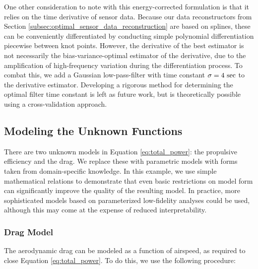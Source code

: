 One other consideration to note with this energy-corrected formulation is that it relies on the time derivative of sensor data. Because our data reconstructors from Section \ref{subsec:optimal_sensor_data_reconstruction} are based on splines, these can be conveniently differentiated by conducting simple polynomial differentiation piecewise between knot points. However, the derivative of the best estimator is not necessarily the bias-variance-optimal estimator of the derivative, due to the amplification of high-frequency variation during the differentiation process. To combat this, we add a Gaussian low-pass-filter with time constant $\sigma=4\ \rm sec$ to the derivative estimator. Developing a rigorous method for determining the optimal filter time constant is left as future work, but is theoretically possible using a cross-validation approach.

\subsection{Modeling the Unknown Functions}
\label{subsec:modeling_unknown_functions}

There are two unknown models in Equation \ref{eq:total_power}: the propulsive efficiency and the drag. We replace these with parametric models with forms taken from domain-specific knowledge. In this example, we use simple mathematical relations to demonstrate that even basic restrictions on model form can significantly improve the quality of the resulting model. In practice, more sophisticated models based on parameterized low-fidelity analyses could be used, although this may come at the expense of reduced interpretability.

\subsubsection{Drag Model}
\label{subsubsec:drag_model}
The aerodynamic drag can be modeled as a function of airspeed, as required to close Equation \ref{eq:total_power}. To do this, we use the following procedure:

